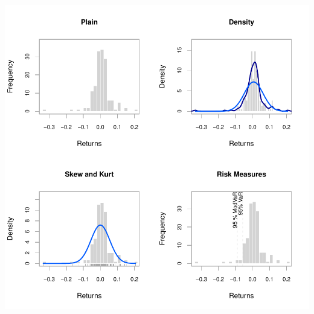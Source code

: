 \documentclass[12pt,letterpaper,english]{article}
\begin{document}
\includegraphics{OWReturn-007}
\end{document}
